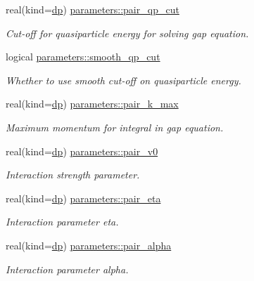 \begin{DoxyCompactItemize}
real(kind=\mbox{\hyperlink{namespaceparameters_a52f8c6351fd79345d8811e065bcbbb37}{dp}}) \mbox{\hyperlink{group__INPUT__PARS_gaddd04025cfa9a151f25211259364f404}{parameters\+::pair\+\_\+qp\+\_\+cut}}
\begin{DoxyCompactList}\small\item\em Cut-\/off for quasiparticle energy for solving gap equation. \end{DoxyCompactList}\item 
logical \mbox{\hyperlink{group__INPUT__PARS_ga20f7226ffbb05232c930c81d83afee32}{parameters\+::smooth\+\_\+qp\+\_\+cut}}
\begin{DoxyCompactList}\small\item\em Whether to use smooth cut-\/off on quasiparticle energy. \end{DoxyCompactList}\item 
real(kind=\mbox{\hyperlink{namespaceparameters_a52f8c6351fd79345d8811e065bcbbb37}{dp}}) \mbox{\hyperlink{group__INPUT__PARS_ga0d7d7715270e262c6f4e02633947b548}{parameters\+::pair\+\_\+k\+\_\+max}}
\begin{DoxyCompactList}\small\item\em Maximum momentum for integral in gap equation. \end{DoxyCompactList}\item 
real(kind=\mbox{\hyperlink{namespaceparameters_a52f8c6351fd79345d8811e065bcbbb37}{dp}}) \mbox{\hyperlink{group__INPUT__PARS_gaecd0609846081f6a90f49cc0f162c9cd}{parameters\+::pair\+\_\+v0}}
\begin{DoxyCompactList}\small\item\em Interaction strength parameter. \end{DoxyCompactList}\item 
real(kind=\mbox{\hyperlink{namespaceparameters_a52f8c6351fd79345d8811e065bcbbb37}{dp}}) \mbox{\hyperlink{group__INPUT__PARS_gacd8c346f8b069e0dca502d57557b21e7}{parameters\+::pair\+\_\+eta}}
\begin{DoxyCompactList}\small\item\em Interaction parameter eta. \end{DoxyCompactList}\item 
real(kind=\mbox{\hyperlink{namespaceparameters_a52f8c6351fd79345d8811e065bcbbb37}{dp}}) \mbox{\hyperlink{group__INPUT__PARS_gaa3116e010e1f1435881ad489d7ea5dad}{parameters\+::pair\+\_\+alpha}}
\begin{DoxyCompactList}\small\item\em Interaction parameter alpha. \end{DoxyCompactList}\item 

\end{DoxyCompactItemize}
